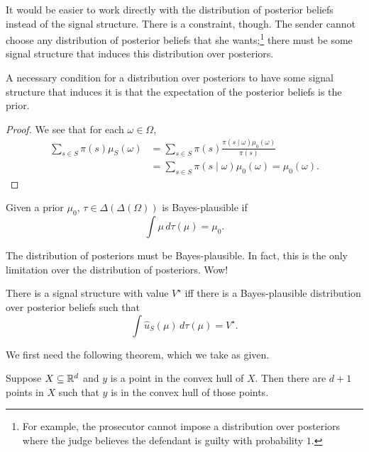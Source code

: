 It would be easier to work directly with the distribution of posterior beliefs instead of the signal structure. There is a constraint, though. The sender cannot choose any distribution of posterior beliefs that she wants;\footnote{For example, the prosecutor cannot impose a distribution over posteriors where the judge believes the defendant is guilty with probability $1$.} there must be some signal structure that induces this distribution over posteriors.

\begin{lemma}
	 A necessary condition for a distribution over posteriors to have some signal structure that induces it is that the expectation of the posterior beliefs is the prior. \label{5-20-1}
\end{lemma}
\begin{proof}
	We see that for each $\omega \in \Omega$,
	\begin{align*}
		\sum\limits_{s\in S}^{} \pi(s) \mu_S(\omega)
		&= \sum\limits_{s\in S}^{} \pi(s) \frac{\pi(s \mid \omega) \mu_0(\omega)}{\pi(s)} \\
		&= \sum\limits_{s \in S}^{} \pi(s \mid \omega) \mu_0(\omega) = \mu_0(\omega)
	.\end{align*}
\end{proof}

\begin{definition}
	Given a prior $\mu_0$, $\tau \in \Delta(\Delta(\Omega))$ is Bayes-plausible if \[
		\int \mu\, d \tau(\mu) = \mu_0
	.\] 
\end{definition}

The distribution of posteriors must be Bayes-plausible. In fact, this is the only limitation over the distribution of posteriors. Wow!

\begin{proposition}
	There is a signal structure with value $V^\star$ iff there is a Bayes-plausible distribution over posterior beliefs such that \[
		\int \hat{u}_S(\mu)\, d \tau(\mu) = V^\star
	.\] \label{5-20-2}
\end{proposition}

We first need the following theorem, which we take as given.
\begin{theorem}
	Suppose $X \subseteq \mathbb{R}^d$ and $y $ is a point in the convex hull of $X$. Then there are $d+1$ points in $X$ such that $y$ is in the convex hull of those points.
\end{theorem}


